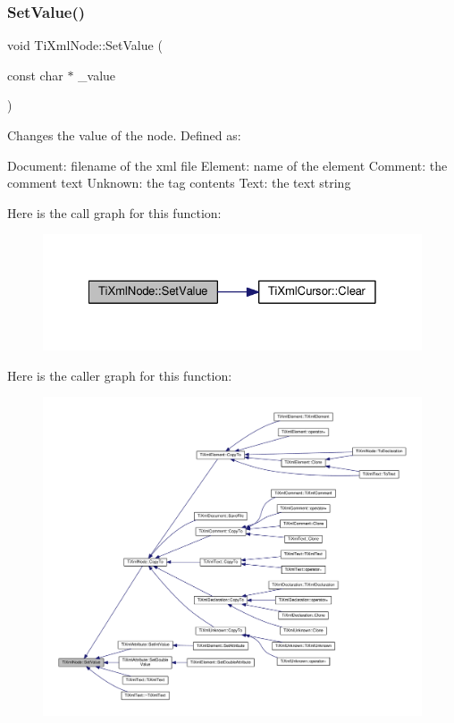 \subsubsection{\texorpdfstring{Set\+Value()}{SetValue()}}
{\footnotesize\ttfamily void Ti\+Xml\+Node\+::\+Set\+Value (\begin{DoxyParamCaption}\item[{const char $\ast$}]{\+\_\+value }\end{DoxyParamCaption})\hspace{0.3cm}{\ttfamily [inline]}}

Changes the value of the node. Defined as\+: \begin{DoxyVerb}Document:   filename of the xml file
Element:    name of the element
Comment:    the comment text
Unknown:    the tag contents
Text:       the text string
\end{DoxyVerb}
 Here is the call graph for this function\+:
\nopagebreak
\begin{figure}[H]
\begin{center}
\leavevmode
\includegraphics[width=328pt]{class_ti_xml_node_a2a38329ca5d3f28f98ce932b8299ae90_cgraph}
\end{center}
\end{figure}
Here is the caller graph for this function\+:
\nopagebreak
\begin{figure}[H]
\begin{center}
\leavevmode
\includegraphics[width=350pt]{class_ti_xml_node_a2a38329ca5d3f28f98ce932b8299ae90_icgraph}
\end{center}
\end{figure}
\mbox{\label{class_ti_xml_node_a5ad43b9d545315e9bb4f50d4cb70de9e}} 
